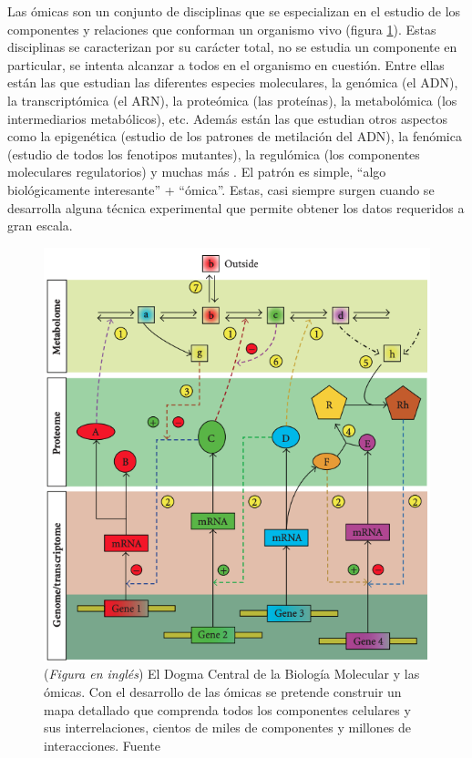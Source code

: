 Las ómicas son un conjunto de disciplinas que se especializan en el estudio de los componentes y relaciones que conforman un organismo vivo (figura \ref{fig:Central_Dogma}).
Estas disciplinas se caracterizan por su carácter total, no se estudia un componente en particular, se intenta alcanzar a todos en el organismo en cuestión.
Entre ellas están las que estudian las diferentes especies moleculares, la genómica (el ADN), la transcriptómica (el ARN), la proteómica (las proteínas), la metabolómica (los intermediarios metabólicos), etc.
Además están las que estudian otros aspectos como la epigenética (estudio de los patrones de metilación del ADN), la fenómica (estudio de todos los fenotipos mutantes), la regulómica (los componentes moleculares regulatorios) y muchas más \cite{evansDesignerScienceOmic2000}.
El patrón es simple, ``algo biológicamente interesante'' + ``ómica''.
Estas, casi siempre surgen cuando se desarrolla alguna técnica experimental que permite obtener los datos requeridos a gran escala.

\begin{figure}[tb]
  \centering
  \includegraphics[width=0.7\columnwidth]{images/Central_Dogma.png}
  \caption{
      (\textit{Figura en inglés})
      El Dogma Central de la Biología Molecular y las ómicas.
      Con el desarrollo de las ómicas se pretende construir un mapa detallado que comprenda todos los componentes celulares y sus interrelaciones, cientos de miles de componentes y millones de interacciones.
      Fuente \cite{likicSystemsBiologyNext2010a}}
  \label{fig:Central_Dogma}
\end{figure}

